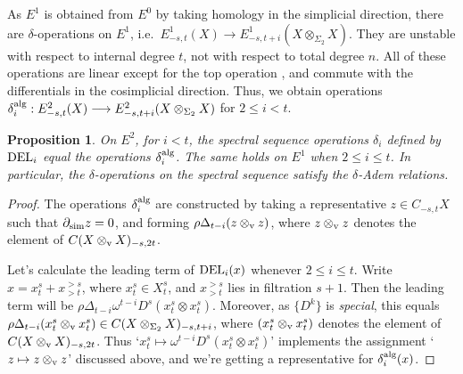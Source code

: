 \documentclass[11pt]{amsart}
\theoremstyle{plain}
\newtheorem{prop}[thm]{Proposition}
\theoremstyle{definition}
\renewcommand{\to}{\longrightarrow}
\theoremstyle{plain}
\newcommand{\twist}{\omega}
\begin{document}
\begin{External spectral sequence operations}
As $E^1$ is obtained from $E^0$ by taking homology in the simplicial direction, there are $\delta$-operations on $E^1$, i.e.\ $E^1_{-s,t}(X)\to E^1_{-s,t+i}(X\otimes_{\Sigma_2}X)$. They are unstable with respect to internal degree $t$, not with respect to total degree $n$. All of these operations are linear except for the top operation \cite[4.2]{DwyerHtpyOpsSimpComAlg.pdf}, and commute with the differentials in the cosimplicial direction. Thus, we obtain operations $\delta_i^\textup{alg}:E^2_{-s,t}(X)\to E^2_{-s,t+i}(X\otimes_{\Sigma_2}X)$ for $2\leq i<t$.
\begin{prop}
On $E^2$, for $i<t$, the spectral sequence operations $\delta_i$ defined by $\textup{DEL}_i$ equal the operations $\delta_i^\textup{alg}$. The same holds on $E^1$ when $2\leq i\leq t$. In particular, the $\delta$-operations on the spectral sequence satisfy the $\delta$-Adem relations.
\end{prop}
\begin{proof}
The operations $\delta_i^\textup{alg}$ are constructed by taking a representative $z\in C_{-s,t}X$ such that $\partial_\textup{sim}z=0$, and forming $\rho\Delta_{t-i}(z\otimes_\textup{v} z)$, where $z\otimes_\textup{v} z$ denotes the element of $C(X\otimes_\textup{v}X)_{-s,2t}$.

Let's calculate the leading term of $\textup{DEL}_{i}(x)$ whenever $2\leq i\leq t$. Write $x=x^s_t+x^{>s}_{>t}$, where $x^s_t\in X^s_t$, and $x^{>s}_{>t}$ lies in filtration $s+1$. Then the leading term will be $\rho\Delta_{t-i}\twist^{t-i}D^s (x^s_t\otimes x^s_t)$. Moreover, as $\{D^k\}$ is \emph{special}, this equals $\rho{\Delta}_{t-i}(x^s_t\otimes_\textup{v} x^s_t)\in C(X\otimes_{\Sigma_2} X)_{-s,t+i}$, where $(x^s_t\otimes_\textup{v} x^s_t)$ denotes the element of $C(X\otimes_\textup{v}X)_{-s,2t}$. Thus `$x^s_t\mapsto \twist^{t-i}D^s(x^s_t\otimes x^s_t)$' implements the assignment `$z\mapsto z\otimes_\textup{v} z$' discussed above, and we're getting a representative for $\delta_i^\textup{alg}(x)$.
\end{proof}


\end{External spectral sequence operations}
\end{document}
